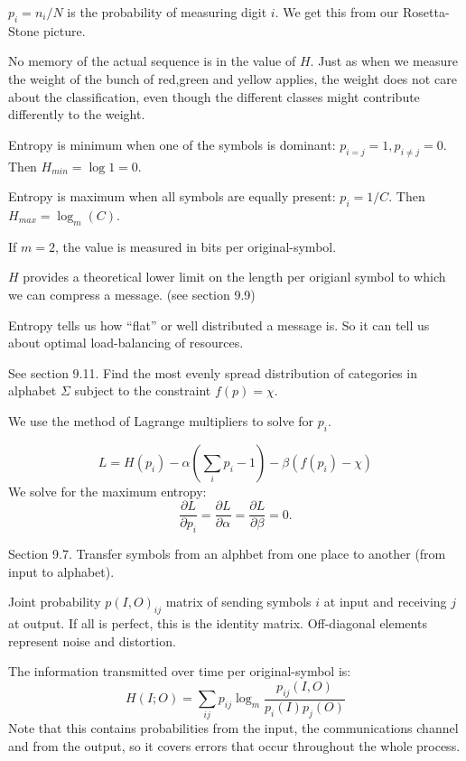 \documentclass{slides}
\begin{document}

$p_i=n_i/N$ is the probability of measuring digit $i$. We get this from our Rosetta-Stone picture.

No memory of the actual sequence is in the value of $H$. Just as when we measure the
weight of the bunch of red,green and yellow applies, the weight does not care about
the classification, even though the different classes might contribute differently
to the weight.

Entropy is minimum when one of the symbols is dominant: $p_{i=j}=1, p_{i\not =j}=0$.
Then $H_{min}=\log 1 = 0$.

Entropy is maximum when all symbols are equally present: $p_i=1/C$. Then $H_{max}=\log_m(C)$.

If $m=2$, the value is measured in bits per original-symbol.



$H$ provides a theoretical lower limit on the length per origianl
symbol to which we can compress a message. (see section 9.9)

Entropy tells us how ``flat'' or well distributed a message is. 
So it can tell us about optimal load-balancing of resources.


See section 9.11. Find the most evenly spread distribution of
categories in alphabet $\Sigma$ subject to the constraint $f(p)=\chi$.

We use the method of Lagrange multipliers to solve for $p_i$.

$$
L = H(p_i) - \alpha \left( \sum_i p_i-1\right) -\beta\left(f(p_i)-\chi\right)
$$
We solve for the maximum entropy:
$$
\frac{\partial L}{\partial p_i} = \frac{\partial L}{\partial\alpha} = \frac{\partial L}{\partial\beta}=0.
$$



Section 9.7.
Transfer symbols from an alphbet from one place to another (from input
to alphabet).

Joint probability $p(I,O)_{ij}$ matrix of sending symbols $i$ at input
and receiving $j$ at output. If all is perfect, this is the identity matrix.
Off-diagonal elements represent noise and distortion.

The information transmitted over time per original-symbol is:
$$
H(I;O) = \sum_{ij} p_{ij} \log_m \frac{p_{ij}(I,O)}{p_i(I)p_j(O)}
$$
Note that this contains probabilities from the input, the communications channel
and from the output, so it covers errors that occur throughout the whole process.
\end{document}
